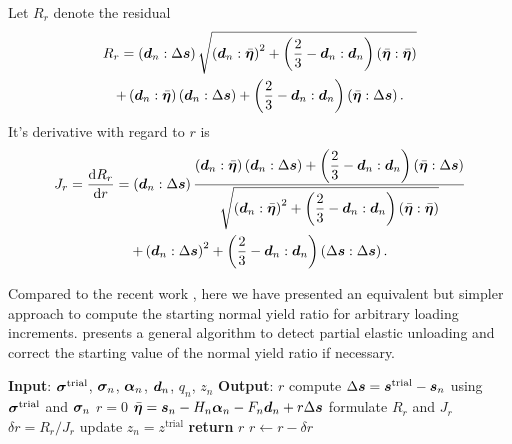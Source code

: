 Let $R_r$ denote the residual
\begin{multline}\label{eq:z_residual}
    R_r=\left(\bm{d}_n:\Delta\bm{s}\right)\sqrt{\left(\bm{d}_n:\bar{\bm{\eta}}\right)^2+\left(\dfrac{2}{3}-\bm{d}_n:\bm{d}_n\right)\left(\bar{\bm{\eta}}:\bar{\bm{\eta}}\right)}\\
    +\left(\bm{d}_n:\bar{\bm{\eta}}\right)\left(\bm{d}_n:\Delta\bm{s}\right)+\left(\dfrac{2}{3}-\bm{d}_n:\bm{d}_n\right)\left(\bar{\bm{\eta}}:\Delta\bm{s}\right).
\end{multline}
It's derivative with regard to $r$ is
\begin{multline}\label{eq:z_derivative}
    J_r=\dfrac{\mathrm{d}R_r}{\mathrm{d}r}=\left(\bm{d}_n:\Delta\bm{s}\right)\dfrac{\left(\bm{d}_n:\bar{\bm{\eta}}\right)\left(\bm{d}_n:\Delta\bm{s}\right)+\left(\dfrac{2}{3}-\bm{d}_n:\bm{d}_n\right)\left(\bar{\bm{\eta}}:\Delta\bm{s}\right)}{\sqrt{\left(\bm{d}_n:\bar{\bm{\eta}}\right)^2+\left(\dfrac{2}{3}-\bm{d}_n:\bm{d}_n\right)\left(\bar{\bm{\eta}}:\bar{\bm{\eta}}\right)}}\\
    +\left(\bm{d}_n:\Delta\bm{s}\right)^2+\left(\dfrac{2}{3}-\bm{d}_n:\bm{d}_n\right)\left(\Delta\bm{s}:\Delta\bm{s}\right).
\end{multline}

Compared to the recent work \citep[e.g.,][]{Hashiguchi2018,Anjiki2019}, here we have presented an equivalent but simpler approach to compute the starting normal yield ratio for arbitrary loading increments.
 presents a general algorithm to detect partial elastic unloading and correct the starting value of the normal yield ratio if necessary.
\begin{breakablealgorithm}
    \caption{correct starting value of normal yield ratio $z$}\label{algo:loading_criterion}
    \begin{algorithmic}[1]
        \State \textbf{Input}: $\bm{\sigma}^\text{trial}$, $\bm{\sigma}_n$, $\bm{\alpha}_{n}$, $\bm{d}_n$, $q_n$, $z_n$
        \State \textbf{Output}: $r$
        \State compute $\Delta\bm{s}=\bm{s}^\text{trial}-\bm{s}_n$ using $\bm{\sigma}^\text{trial}$ and $\bm{\sigma}_n$
        \State $r=0$
        \State $\bar{\bm{\eta}}=\bm{s}_n-H_n\bm{\alpha}_n-F_n\bm{d}_n+r\Delta\bm{s}$
        \State formulate $R_r$ and $J_r$
        \State $\delta{}r=R_r/J_r$
        \State update $z_{n}=z^\text{trial}$
        \EndIf
        \State \textbf{return} $r$
        \EndIf
        \State $r\leftarrow{}r-\delta{}r$
        \EndWhile
    \end{algorithmic}
\end{breakablealgorithm}
